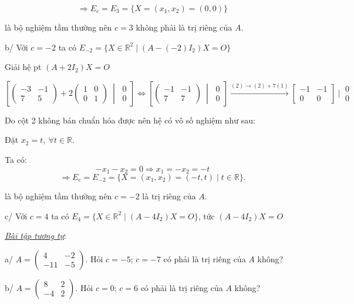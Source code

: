 \documentclass[12pt,a4paper]{article}
\newcommand{\R}{\mathbb{R}}
\begin{document}
\[
\Rightarrow E_c=E_3=\{X=(x_1,x_2)=(0,0)\}
\]

là bộ nghiệm tầm thường nên $c=3$ không phải là trị riêng của $A$.

b/ Với $c=-2$ ta có $E_{-2}=\{X\in\R^2 \mid (A-(-2)I_2)X=O\}$

Giải hệ pt $(A+2I_2)X=O$

\[
\left[\begin{pmatrix}-3 & -1\\ 7 & 5\end{pmatrix}+2\begin{pmatrix}1 & 0\\ 0 & 1\end{pmatrix}\ \middle|\ \begin{matrix}0\\0\end{matrix}\right]
\Leftrightarrow
\left[\begin{pmatrix}-1 & -1\\ 7 & 7\end{pmatrix}\ \middle|\ \begin{matrix}0\\0\end{matrix}\right]
\xrightarrow{(2)\to(2)+7(1)}
\begin{bmatrix}-1 & -1\\ 0 & 0\end{bmatrix}\ \big|\ \begin{matrix}0\\0\end{matrix}
\]

Do cột 2 không bán chuẩn hóa được nên hệ có vô số nghiệm như sau:

Đặt $x_2=t,\ \forall t\in\R$.

Ta có:
\[
-x_1-x_2=0\Rightarrow x_1=-x_2=-t
\]
\[
\Rightarrow E_c=E_{-2}=\{X=(x_1,x_2)=(-t,t)\mid t\in\R\}.
\]

là bộ nghiệm tầm thường nên $c=-2$ là trị riêng của $A$.

c/ Với $c=4$ ta có $E_4=\{X\in\R^2 \mid (A-4I_2)X=O\}$, tức $(A-4I_2)X=O$

\medskip
\noindent\textit{\underline{Bài tập tương tự}}:

a/ $A=\begin{pmatrix}4 & -2\\ -11 & -5\end{pmatrix}$. Hỏi $c=-5$; $c=-7$ có phải là trị riêng của $A$ không?

b/ $A=\begin{pmatrix}8 & 2\\ -4 & 2\end{pmatrix}$. Hỏi $c=0$; $c=6$ có phải là trị riêng của $A$ không?
\end{document}
